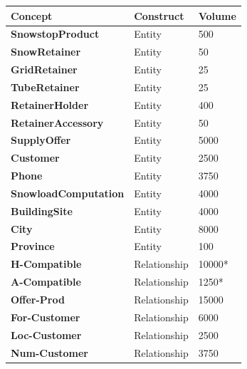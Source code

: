 \documentclass{article}[h]
\begin{document}
\begin{table}[H]
  \def\arraystretch{1.25}%
  \centering
  \begin{tabular}{ | m{4.5cm} | m{4.5cm}| m{4.5cm} |}  
    \hline
    {\textbf{\large Concept}} & {\textbf{\large Construct}} & {\textbf{\large Volume}} \\ 
    \hline
    \color[HTML]{3531FF} \textbf{SnowstopProduct} & Entity & 500  \\ 
    \hline
    \color[HTML]{3531FF} \textbf{SnowRetainer} & Entity & 50 \\  
    \hline
    \color[HTML]{3531FF} \textbf{GridRetainer} & Entity & 25 \\ 
    \hline
    \color[HTML]{3531FF} \textbf{TubeRetainer} & Entity & 25 \\ 
    \hline
    \color[HTML]{3531FF} \textbf{RetainerHolder} & Entity & 400 \\ 
    \hline
    \color[HTML]{3531FF} \textbf{RetainerAccessory} & Entity & 50 \\ 
    \hline
    \color[HTML]{3531FF} \textbf{SupplyOffer} & Entity & 5000\\  
    \hline
    \color[HTML]{3531FF} \textbf{Customer} & Entity & 2500\\ 
    \hline
    \color[HTML]{3531FF} \textbf{Phone} & Entity & 3750 \\ 
    \hline
    \color[HTML]{3531FF} \textbf{SnowloadComputation} & Entity & 4000\\  
    \hline
    \color[HTML]{3531FF} \textbf{BuildingSite} & Entity & 4000\\ 
    \hline
    \color[HTML]{3531FF} \textbf{City} & Entity & 8000 \\ 
    \hline
    \color[HTML]{3531FF} \textbf{Province} & Entity & 100 \\ 
    \hline
    \color[HTML]{3531FF} \textbf{H-Compatible} & Relationship & 10000* \\ 
    \hline
    \color[HTML]{3531FF} \textbf{A-Compatible} & Relationship & 1250* \\ 
    \hline
    \color[HTML]{3531FF} \textbf{Offer-Prod} & Relationship & 15000\\ 
    \hline
    \color[HTML]{3531FF} \textbf{For-Customer} & Relationship & 6000\\ 
    \hline
    \color[HTML]{3531FF} \textbf{Loc-Customer} & Relationship & 2500\\ 
    \hline
    \color[HTML]{3531FF} \textbf{Num-Customer} & Relationship & 3750 \\ 

\end{tabular}
\end{table}
\end{document}
